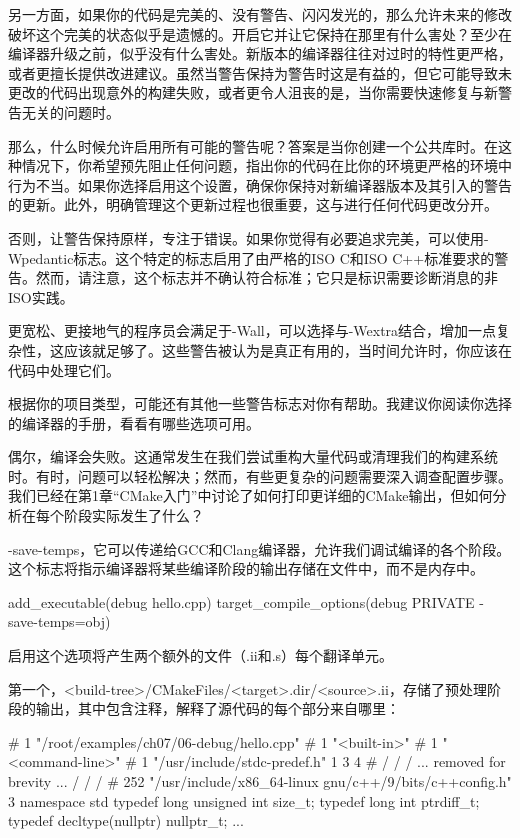 另一方面，如果你的代码是完美的、没有警告、闪闪发光的，那么允许未来的修改破坏这个完美的状态似乎是遗憾的。开启它并让它保持在那里有什么害处？至少在编译器升级之前，似乎没有什么害处。新版本的编译器往往对过时的特性更严格，或者更擅长提供改进建议。虽然当警告保持为警告时这是有益的，但它可能导致未更改的代码出现意外的构建失败，或者更令人沮丧的是，当你需要快速修复与新警告无关的问题时。

那么，什么时候允许启用所有可能的警告呢？答案是当你创建一个公共库时。在这种情况下，你希望预先阻止任何问题，指出你的代码在比你的环境更严格的环境中行为不当。如果你选择启用这个设置，确保你保持对新编译器版本及其引入的警告的更新。此外，明确管理这个更新过程也很重要，这与进行任何代码更改分开。

否则，让警告保持原样，专注于错误。如果你觉得有必要追求完美，可以使用-Wpedantic标志。这个特定的标志启用了由严格的ISO C和ISO C++标准要求的警告。然而，请注意，这个标志并不确认符合标准；它只是标识需要诊断消息的非ISO实践。

更宽松、更接地气的程序员会满足于-Wall，可以选择与-Wextra结合，增加一点复杂性，这应该就足够了。这些警告被认为是真正有用的，当时间允许时，你应该在代码中处理它们。

根据你的项目类型，可能还有其他一些警告标志对你有帮助。我建议你阅读你选择的编译器的手册，看看有哪些选项可用。


偶尔，编译会失败。这通常发生在我们尝试重构大量代码或清理我们的构建系统时。有时，问题可以轻松解决；然而，有些更复杂的问题需要深入调查配置步骤。我们已经在第1章“CMake入门”中讨论了如何打印更详细的CMake输出，但如何分析在每个阶段实际发生了什么？


-save-temps，它可以传递给GCC和Clang编译器，允许我们调试编译的各个阶段。这个标志将指示编译器将某些编译阶段的输出存储在文件中，而不是内存中。


\begin{cmake}
add_executable(debug hello.cpp)
target_compile_options(debug PRIVATE -save-temps=obj)
\end{cmake}

启用这个选项将产生两个额外的文件（.ii和.s）每个翻译单元。


第一个，<build-tree>/CMakeFiles/<target>.dir/<source>.ii，存储了预处理阶段的输出，其中包含注释，解释了源代码的每个部分来自哪里：

\begin{shell}
# 1 "/root/examples/ch07/06-debug/hello.cpp"
# 1 "<built-in>"
# 1 "<command-line>"
# 1 "/usr/include/stdc-predef.h" 1 3 4
# / / / ... removed for brevity ... / / /
# 252 "/usr/include/x86_64-linux
  gnu/c++/9/bits/c++config.h" 3
namespace std
{
    typedef long unsigned int size_t;
    typedef long int ptrdiff_t;
    typedef decltype(nullptr) nullptr_t;
}
...
\end{shell}

